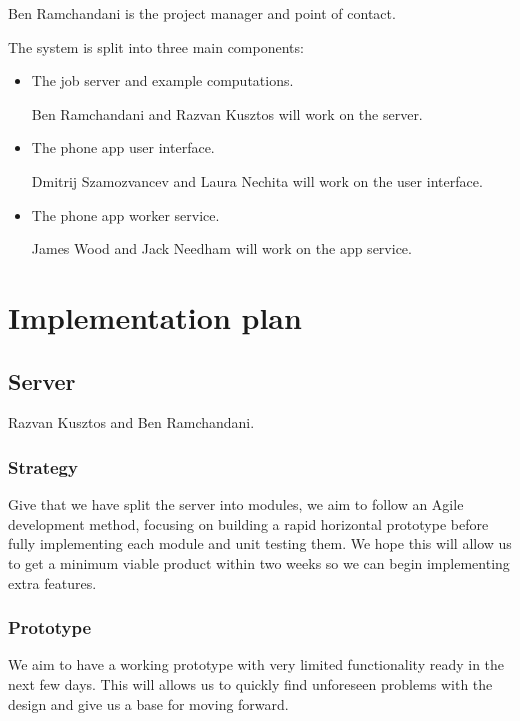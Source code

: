 \documentclass[
  twoside,
  10pt, a4paper
]{article}
\begin{document}
Ben Ramchandani is the project manager and point of contact.

The system is split into three main components:
\begin{itemize}
\item The job server and example computations.

Ben Ramchandani and Razvan Kusztos will work on the server.

\item The phone app user interface.

Dmitrij Szamozvancev and Laura Nechita will work on the user interface.

\item The phone app worker service.

James Wood and Jack Needham will work on the app service.
\end{itemize}



\newpage
\section{Implementation plan}


\subsection{Server}

Razvan Kusztos and Ben Ramchandani.

\subsubsection{Strategy}

Give that we have split the server into modules, we aim to follow an Agile development method, focusing on building a rapid horizontal prototype before fully implementing each module
and unit testing them. We hope this will allow us to get a minimum viable product within two weeks so we can begin implementing extra features.

\subsubsection{Prototype}

We aim to have a working prototype with very limited functionality ready in the next few days.
This will allows us to quickly find unforeseen problems with the design and give us a base for moving forward.\\
\end{document}
